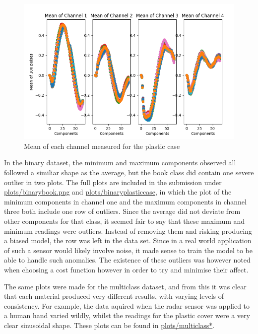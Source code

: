 \documentclass[12pt]{article}
\begin{document}
\begin{figure}[!ht]
	\centering
	\includegraphics[width=\linewidth]{images/plasticcase}
	\caption{Mean of each channel measured for the plastic case}
	\label{fig:plasticcase}
\end{figure}

In the binary dataset, the minimum and maximum components observed all followed a similiar shape as the average, but the book class did contain one severe outlier in two plots. The full plots are included in the submission under \url{plots/binarybook.png} and \url{plots/binaryplasticcase}, in which the plot of the minimum components in channel one and the maximum components in channel three both include one row of outliers. Since the average did not deviate from other components for that class, it seemed fair to say that these maximum and minimum readings were outliers. Instead of removing them and risking producing a biased model, the row was left in the data set. Since in a real world application of such a sensor would likely involve noise, it made sense to train the model to be able to handle such anomalies. The existence of these outliers was however noted when choosing a cost function however in order to try and minimise their affect.

The same plots were made for the multiclass dataset, and from this it was clear that each material produced very different results, with varying levels of consistency. For example, the data aquired when the radar sensor was applied to a human hand varied wildly, whilst the readings for the plastic cover were a very clear sinusoidal shape. These plots can be found in \url{plots/multiclass*}.
\end{document}
